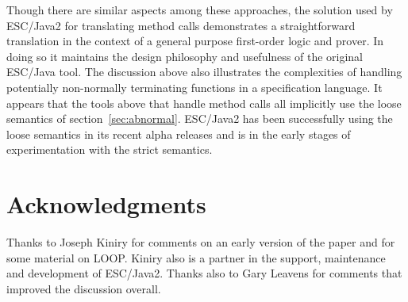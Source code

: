 \documentclass{sig-alternate}
\begin{document}
Though there are similar aspects among these approaches, the solution
used by ESC/Java2 for translating method calls demonstrates a
straightforward translation in the context of a general purpose first-order logic
and prover.  In doing so it maintains the design philosophy and
usefulness of the original ESC/Java tool.  The discussion above also illustrates the
complexities of handling potentially non-normally terminating functions in a 
specification language.  It appears that the tools above that handle method calls all
implicitly use the loose semantics of section~\ref{sec:abnormal}.  ESC/Java2 has
been successfully using the loose semantics in its recent alpha releases and is in
the early stages of experimentation with the strict semantics.

\section{Acknowledgments}

Thanks to Joseph Kiniry for comments on an early version of the paper and
for some material on LOOP.  Kiniry also is a partner in the support, maintenance and
development of ESC/Java2.  Thanks also to Gary Leavens for
comments that improved the discussion overall.

%

%

  


%
%



\end{document}

